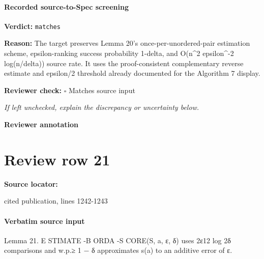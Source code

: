 \documentclass[10pt]{article}
\newcommand{\reviewerbox}{%
  \par\noindent\fbox{\parbox{0.96\linewidth}{\rule{0pt}{0.38in}}}\par
}
\newcommand{\reviewmatch}[1]{%
  \par\noindent\textbf{Reviewer check:} $\square$\; #1\par
  \noindent\emph{If left unchecked, explain the discrepancy or uncertainty below.}\par
}
\begin{document}
\paragraph{Recorded source-to-Spec screening}
\textbf{Verdict:} \texttt{matches}
\\
{\raggedright
\textbf{Reason:} The target preserves Lemma 20's once-\allowbreak{}per-\allowbreak{}unordered-\allowbreak{}pair estimation scheme, epsilon-\allowbreak{}ranking success probability 1-\allowbreak{}delta, and O(n\textasciicircum{}2 epsilon\textasciicircum{}-\allowbreak{}2 log(n/\allowbreak{}delta)) source rate.\allowbreak{} It uses the proof-\allowbreak{}consistent complementary reverse estimate and epsilon/\allowbreak{}2 threshold already documented for the Algorithm 7 display.\allowbreak{}
\par}
\reviewmatch{Matches source input}
\noindent\textbf{Reviewer annotation}\par
\reviewerbox
\clearpage
\hypertarget{source-claim-40bce86938f6a991}{}
\section*{Review row 21}
\textbf{Source locator:} {\footnotesize\raggedright cited publication, lines 1242-\allowbreak{}1243\par}
\paragraph{Verbatim source input}
\begin{ReviewVerbatim}
Lemma 21. E STIMATE -B ORDA -S CORE(S, a, ε, δ) uses 2ε12 log 2δ comparisons and w.p.≥ 1 − δ approximates
s(a) to an additive error of ε.
\end{ReviewVerbatim}
\end{document}
